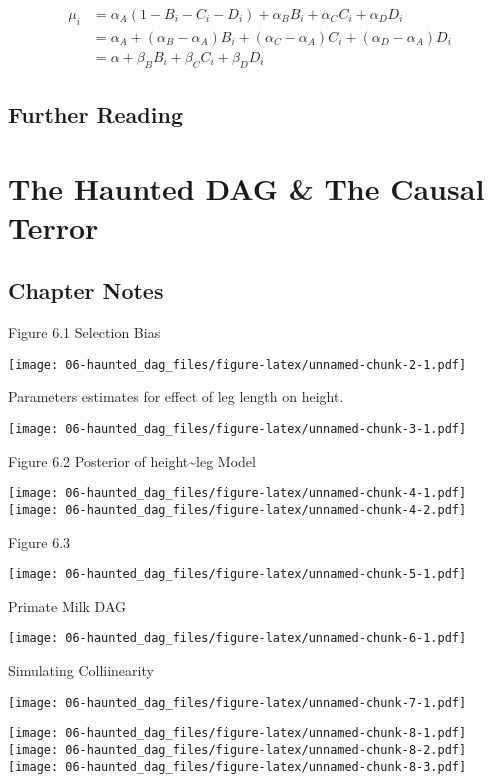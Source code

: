 \documentclass[
]{book}
\begin{document}
\[
\begin{aligned}
\mu_i &= \alpha_A(1 − B_i − C_i −D_i) + \alpha_B B_i + \alpha_C C_i + \alpha_D D_i \\
&= \alpha_A + (\alpha_B-\alpha_A)B_i + (\alpha_C -\alpha_A)C_i +(\alpha_D-\alpha_A)D_i  \\
&= \alpha + \beta_B B_i + \beta_C C_i + \beta_D D_i
\end{aligned}          
\]

\hypertarget{further-reading-4}{%
\section*{Further Reading}\label{further-reading-4}}

\hypertarget{haunted_dag}{%
\chapter{The Haunted DAG \& The Causal Terror}\label{haunted_dag}}

\hypertarget{chapter-notes-5}{%
\section{Chapter Notes}\label{chapter-notes-5}}

Figure 6.1 Selection Bias

\texttt{[image: 06-haunted\_dag\_files/figure-latex/unnamed-chunk-2-1.pdf]}

Parameters estimates for effect of leg length on height.

\texttt{[image: 06-haunted\_dag\_files/figure-latex/unnamed-chunk-3-1.pdf]}

Figure 6.2 Posterior of height\textasciitilde leg Model

\texttt{[image: 06-haunted\_dag\_files/figure-latex/unnamed-chunk-4-1.pdf]} \texttt{[image: 06-haunted\_dag\_files/figure-latex/unnamed-chunk-4-2.pdf]}

Figure 6.3

\texttt{[image: 06-haunted\_dag\_files/figure-latex/unnamed-chunk-5-1.pdf]}

Primate Milk DAG

\texttt{[image: 06-haunted\_dag\_files/figure-latex/unnamed-chunk-6-1.pdf]}

Simulating Colliinearity

\texttt{[image: 06-haunted\_dag\_files/figure-latex/unnamed-chunk-7-1.pdf]}

\texttt{[image: 06-haunted\_dag\_files/figure-latex/unnamed-chunk-8-1.pdf]} \texttt{[image: 06-haunted\_dag\_files/figure-latex/unnamed-chunk-8-2.pdf]} \texttt{[image: 06-haunted\_dag\_files/figure-latex/unnamed-chunk-8-3.pdf]}
\end{document}
